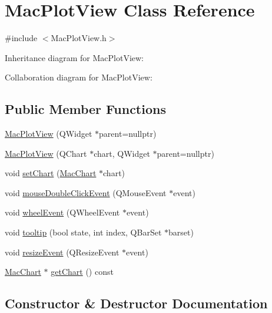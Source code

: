 \hypertarget{class_mac_plot_view}{}\section{Mac\+Plot\+View Class Reference}
\label{class_mac_plot_view}


{\ttfamily \#include $<$Mac\+Plot\+View.\+h$>$}



Inheritance diagram for Mac\+Plot\+View\+:


Collaboration diagram for Mac\+Plot\+View\+:
\subsection*{Public Member Functions}
\begin{DoxyCompactItemize}
\item 
\hyperlink{class_mac_plot_view_aea0a23f2f4ea570f2b34453921a927a4}{Mac\+Plot\+View} (Q\+Widget $\ast$parent=nullptr)
\item 
\hyperlink{class_mac_plot_view_a73ca1566b83a58c35c88f265990147e5}{Mac\+Plot\+View} (Q\+Chart $\ast$chart, Q\+Widget $\ast$parent=nullptr)
\item 
void \hyperlink{class_mac_plot_view_a5e2e6331dd75f3691bf0319a25f5ed5e}{set\+Chart} (\hyperlink{class_mac_chart}{Mac\+Chart} $\ast$chart)
\item 
void \hyperlink{class_mac_plot_view_a99e15dc00fcfc0ea68b0520aeb41438d}{mouse\+Double\+Click\+Event} (Q\+Mouse\+Event $\ast$event)
\item 
void \hyperlink{class_mac_plot_view_a743b5945dc70501d16366099968e14ca}{wheel\+Event} (Q\+Wheel\+Event $\ast$event)
\item 
void \hyperlink{class_mac_plot_view_a1d9de9a7c8389351e2c63c738e74817b}{tooltip} (bool state, int index, Q\+Bar\+Set $\ast$barset)
\item 
void \hyperlink{class_mac_plot_view_ac50fe3c6edc2c1e51391e1ad284bf0c4}{resize\+Event} (Q\+Resize\+Event $\ast$event)
\item 
\hyperlink{class_mac_chart}{Mac\+Chart} $\ast$ \hyperlink{class_mac_plot_view_ace6724256e9667f61ef613200e880e2a}{get\+Chart} () const
\end{DoxyCompactItemize}


\subsection{Constructor \& Destructor Documentation}
\mbox{\label{class_mac_plot_view_aea0a23f2f4ea570f2b34453921a927a4}} 
